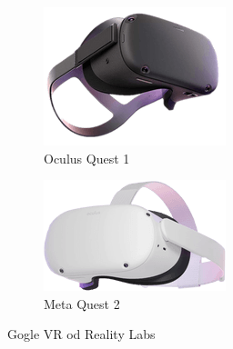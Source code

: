 \documentclass[a4paper,12pt,reqno]{article}
\begin{document}
\begin{figure}[!ht]%
	\centering
	\begin{subfigure}{.5\textwidth}
		\centering
		\includegraphics[width=0.8\linewidth]{graphics/oculusquest.png}
		\caption{Oculus Quest 1}	
		\label{ref:subref_a}
	\end{subfigure}%
	\begin{subfigure}{.5\textwidth}
		\centering
		\includegraphics[width=0.8\linewidth]{graphics/oculusquest2.png}
		\caption{Meta Quest 2}
		\label{ref:subref_b}
	\end{subfigure}%
	

\caption{Gogle VR od Reality Labs}
\label{ref:ref}
\end{figure}
\end{document}
